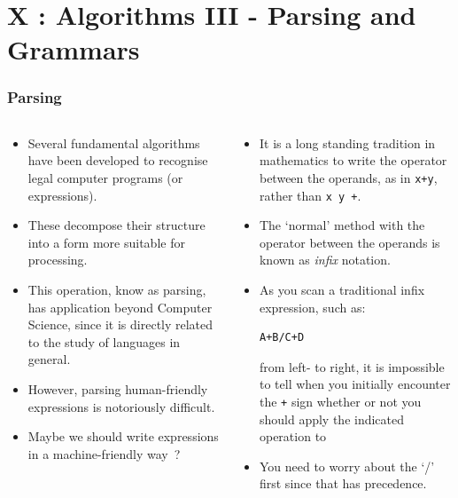 \section{X : Algorithms III - Parsing and Grammars}
\label{chap:algos3}


\begin{frame}[fragile]
\frametitle{Parsing}
\begin{columns}[T]

\begin{column}{0.45\textwidth}
\begin{itemize}[<+->]
\item Several fundamental algorithms have been developed
to recognise legal computer programs (or expressions).
\item These decompose their structure into a form more suitable for processing.
\item This operation, know as parsing, has application
beyond Computer Science, since it is directly related to the study of
languages in general.
\item However, parsing human-friendly expressions is notoriously difficult.
\item Maybe we should write expressions in a machine-friendly way~?
\end{itemize}
\end{column}

\pause
\begin{column}{0.45\textwidth}
\begin{itemize}[<+->]
\item It is a long standing tradition in mathematics to write the operator
between the operands, as in \verb^x+y^, rather than \verb^x y +^.
\item The `normal' method with the operator between the operands is
known as {\it infix} notation.
\item As you scan a traditional infix expression, such as:
\begin{verbatim}
A+B/C+D
\end{verbatim}
from left- to right, it is impossible to tell when you initially encounter the \verb^+^ sign whether or not you should apply the indicated operation to
\item You need to worry about the `/' first since that has precedence. 
\end{itemize}
\end{column}

\end{columns}
\end{frame}


